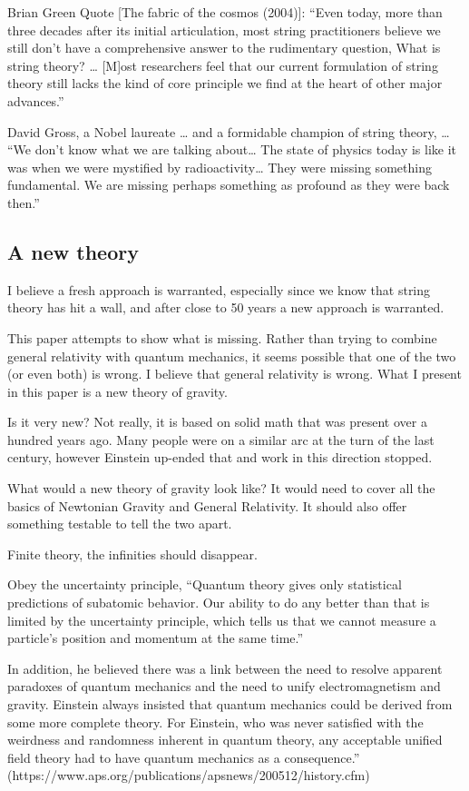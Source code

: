 \documentclass {article}
\begin{document}
	Brian Green Quote [The fabric of the cosmos (2004)]: “Even today, more than three decades after its initial articulation, most string practitioners believe we still don’t have a comprehensive answer to the rudimentary question, What is string theory? … [M]ost researchers feel that our current formulation of string theory still lacks the kind of core principle we find at the heart of other major advances.”
	
	David Gross, a Nobel laureate … and a formidable champion of string theory, … “We don’t know what we are talking about… The state of physics today is like it was when we were mystified by radioactivity… They were missing something fundamental. We are missing perhaps something as profound as they were back then.”
	
	\subsection{A new theory}
		I believe a fresh approach is warranted, especially since we know that string theory has hit a wall, and after close to 50 years a new approach is warranted.
		
		This paper attempts to show what is missing. Rather than trying to combine general relativity with quantum mechanics, it seems possible that one of the two (or even both) is wrong. I believe that general relativity is wrong. What I present in this paper is a new theory of gravity.
		
		Is it very new? Not really, it is based on solid math that was present over a hundred years ago. Many people were on a similar arc at the turn of the last century, however Einstein up-ended that and work in this direction stopped.
		
		What would a new theory of gravity look like? It would need to cover all the basics of Newtonian Gravity and General Relativity. It should also offer something testable to tell the two apart.
		
		Finite theory, the infinities should disappear.
		
		Obey the uncertainty principle, “Quantum theory gives only statistical predictions of subatomic behavior. Our ability to do any better than that is limited by the uncertainty principle, which tells us that we cannot measure a particle’s position and momentum at the same time.”
		
		In addition, he believed there was a link between the need to resolve apparent paradoxes of quantum mechanics and the need to unify electromagnetism and gravity. Einstein always insisted that quantum mechanics could be derived from some more complete theory. For Einstein, who was never satisfied with the weirdness and randomness inherent in quantum theory, any acceptable unified field theory had to have quantum mechanics as a consequence.” (https://www.aps.org/publications/apsnews/200512/history.cfm)
		
\end{document}
